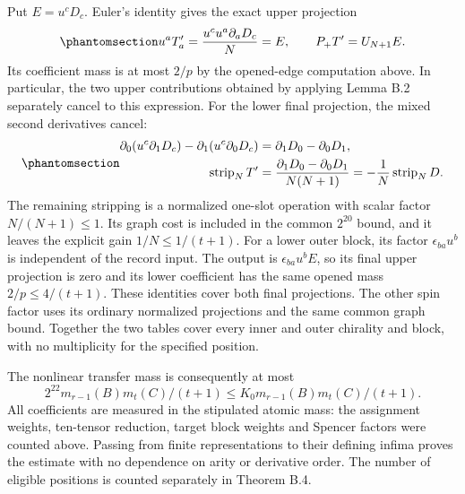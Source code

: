 \documentclass[
  english,
  11pt,
  reqno]{amsart}
\begin{document}
Put \(E=u^cD_c\). Euler's identity gives the exact upper projection
\begin{equation}\protect\phantomsection\label{eq:gg-budget-exact-upper-projection}{
 u^aT'_a=\frac{u^cu^a\partial_aD_c}{N}=E,
 \qquad P_+T'=U_{N+1}E.
}\end{equation} Its coefficient mass is at most \(2/p\) by the
opened-edge computation above. In particular, the two upper
contributions obtained by applying Lemma B.2 separately cancel to this
expression. For the lower final projection, the mixed second derivatives
cancel:
\begin{equation}\protect\phantomsection\label{eq:gg-budget-upper-lower-cancellation}{
 \begin{aligned}
 \partial_0(u^c\partial_1D_c)
       -\partial_1(u^c\partial_0D_c)
      &=\partial_1D_0-\partial_0D_1,\\
 \operatorname{strip}_N T'
      &=\frac{\partial_1D_0-\partial_0D_1}{N(N+1)}
        =-\frac1N\operatorname{strip}_N D .
 \end{aligned}
}\end{equation} The remaining stripping is a normalized one-slot
operation with scalar factor \(N/(N+1)\le1\). Its graph cost is included
in the common \(2^{20}\) bound, and it leaves the explicit gain
\(1/N\le1/(t+1)\). For a lower outer block, its factor
\(\epsilon_{ba}u^b\) is independent of the record input. The output is
\(\epsilon_{ba}u^b E\), so its final upper projection is zero and its
lower coefficient has the same opened mass \(2/p\le4/(t+1)\). These
identities cover both final projections. The other spin factor uses its
ordinary normalized projections and the same common graph bound.
Together the two tables cover every inner and outer chirality and block,
with no multiplicity for the specified position.

The nonlinear transfer mass is consequently at most
\[2^{22}m_{r-1}(B)m_t(C)/(t+1)\le K_0m_{r-1}(B)m_t(C)/(t+1).\] All
coefficients are measured in the stipulated atomic mass: the assignment
weights, ten-tensor reduction, target block weights and Spencer factors
were counted above. Passing from finite representations to their
defining infima proves the estimate with no dependence on arity or
derivative order. The number of eligible positions is counted separately
in Theorem B.4.
\end{document}

